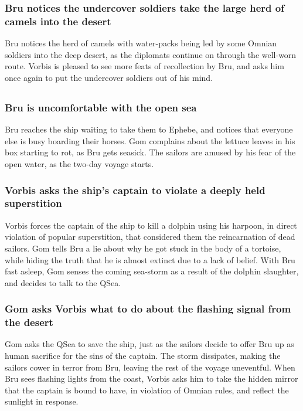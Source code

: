 \subsubsection{\Gls{Bru} notices the undercover soldiers take the large herd of camels into the
    desert}
\Gls{Bru} notices the herd of camels with water-packs being led by some Omnian soldiers into the
deep desert, as the diplomats continue on through the well-worn route. \Gls{Vorbis} is pleased to
see more feats of recollection by \Gls{Bru}, and asks him once again to put the undercover
soldiers out of his mind.

\subsection{}
\subsubsection{\Gls{Bru} is uncomfortable with the open sea}
\Gls{Bru} reaches the ship waiting to take them to Ephebe, and notices that everyone else is busy
boarding their horses. \Gls{Gom} complains about the lettuce leaves in his box starting to rot, as
\Gls{Bru} gets seasick. The sailors are amused by his fear of the open water, as the two-day voyage
starts.

\subsubsection{\Gls{Vorbis} asks the ship's captain to violate a deeply held superstition}
\Gls{Vorbis} forces the captain of the ship to kill a dolphin using his harpoon, in direct violation
of popular superstition, that considered them the reincarnation of dead sailors. \Gls{Gom} tells
\Gls{Bru} a lie about why he got stuck in the body of a tortoise, while hiding the truth that he is
almost extinct due to a lack of belief. With \Gls{Bru} fast asleep, \Gls{Gom} senses the coming
sea-storm as a result of the dolphin slaughter, and decides to talk to the \Gls{QSea}.

\subsubsection{\Gls{Gom} asks \Gls{Vorbis} what to do about the flashing signal from the desert}
\Gls{Gom} asks the \Gls{QSea} to save the ship, just as the sailors decide to offer \Gls{Bru} up as
human sacrifice for the sins of the captain. The storm dissipates, making the sailors cower in
terror from \Gls{Bru}, leaving the rest of the voyage uneventful. When \Gls{Bru} sees flashing
lights from the coast, \Gls{Vorbis} asks him to take the hidden mirror that the captain is bound to
have, in violation of Omnian rules, and reflect the sunlight in response.

